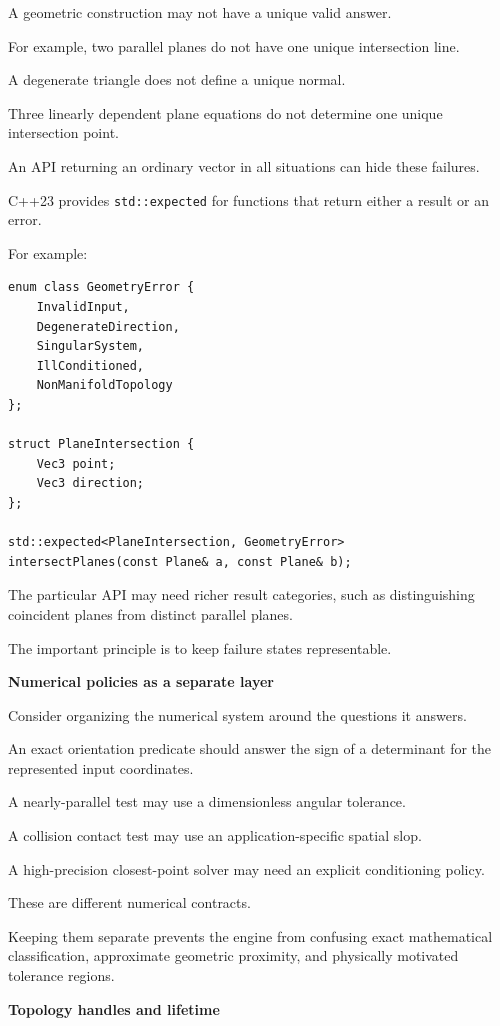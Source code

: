 A geometric construction may not have a unique valid answer.

For example, two parallel planes do not have one unique intersection line.

A degenerate triangle does not define a unique normal.

Three linearly dependent plane equations do not determine one unique intersection point.

An API returning an ordinary vector in all situations can hide these failures.

C++23 provides \texttt{std::expected} for functions that return either a result or an error.

For example:

\begin{verbatim}
enum class GeometryError {
    InvalidInput,
    DegenerateDirection,
    SingularSystem,
    IllConditioned,
    NonManifoldTopology
};

struct PlaneIntersection {
    Vec3 point;
    Vec3 direction;
};

std::expected<PlaneIntersection, GeometryError>
intersectPlanes(const Plane& a, const Plane& b);
\end{verbatim}

The particular API may need richer result categories, such as distinguishing coincident planes from distinct parallel planes.

The important principle is to keep failure states representable.

\textbf{Numerical policies as a separate layer}

Consider organizing the numerical system around the questions it answers.

An exact orientation predicate should answer the sign of a determinant for the represented input coordinates.

A nearly-parallel test may use a dimensionless angular tolerance.

A collision contact test may use an application-specific spatial slop.

A high-precision closest-point solver may need an explicit conditioning policy.

These are different numerical contracts.

Keeping them separate prevents the engine from confusing exact mathematical classification, approximate geometric proximity, and physically motivated tolerance regions.

\textbf{Topology handles and lifetime}

